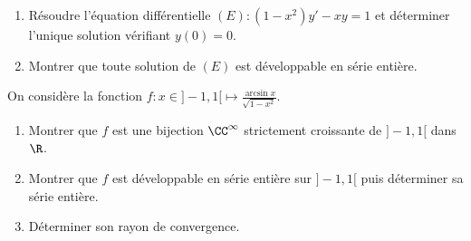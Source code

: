 \begin{enonce}
\begin{exercise}[ID={RMS126 E871},subtitle={CCP MP 2015},tags={}]
\begin{enumerate}
  \item Résoudre l'équation différentielle $(E): (1-x^2) y' - x y = 1$ et déterminer l'unique solution vérifiant $y(0)=0$.

  \item Montrer que toute solution de $(E)$ est développable en série entière.
\end{enumerate}
On considère la fonction $f:x\in]-1,1[\mapsto\frac{\arcsin x}{\sqrt{1-x^2}}$.
\begin{enumerate}[resume]
  \item Montrer que $f$ est une bijection $\CC^\infty$ strictement croissante de $]-1,1[$ dans $\R$.

  \item Montrer que $f$ est développable en série entière sur $]-1,1[$ puis déterminer sa série entière.

  \item Déterminer son rayon de convergence.

\end{enumerate}
\end{exercise}
\begin{solution}
\end{solution}
\end{enonce}
